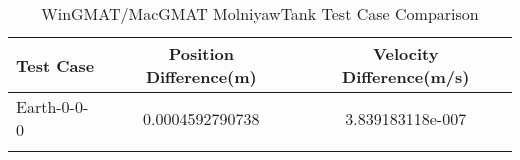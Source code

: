 \begin{table}[htbp!]
\centering
\caption{ WinGMAT/MacGMAT MolniyawTank Test Case Comparison}
      \begin{tabular}{lcc}
      \hline\hline
          Test Case & Position Difference(m) & Velocity Difference(m/s) \\
         \hline
         Earth-0-0-0 & 0.0004592790738 & 3.839183118e-007 \\
      \hline\hline
      \label{Table: MolniyawTank WinGMAT-MacGMAT Table} 
\end{tabular}
\end{table}
